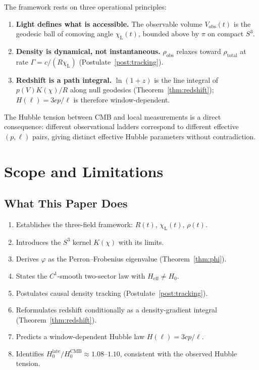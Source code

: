 \documentclass[12pt,a4paper]{amsart}
\theoremstyle{plain}
\theoremstyle{definition}
\theoremstyle{remark}
\newcommand{\vp}{\varphi}
\newcommand{\Sthree}{S^3}
\newcommand{\Hzero}{H_0}
\newcommand{\Heff}{H_{\mathrm{eff}}}
\newcommand{\Vobs}{V_{\mathrm{obs}}}
\newcommand{\chiL}{\chi_{\mathrm{L}}}
\newcommand{\rhotot}{\rho_{\mathrm{total}}}
\newcommand{\rhoobs}{\rho_{\mathrm{obs}}}
\begin{document}
The framework rests on three operational principles:

\begin{enumerate}[label=(\arabic*),noitemsep]
\item \textbf{Light defines what is accessible.} The observable volume
  $\Vobs(t)$ is the geodesic ball of comoving angle $\chiL(t)$,
  bounded above by $\pi$ on compact $\Sthree$.
\item \textbf{Density is dynamical, not instantaneous.} $\rhoobs$
  relaxes toward $\rhotot$ at rate $\Gamma=c/(R\chiL)$
  (Postulate~\ref{post:tracking}).
\item \textbf{Redshift is a path integral.} $\ln(1+z)$ is the line
  integral of $p(V)K(\chi)/R$ along null geodesics
  (Theorem~\ref{thm:redshift}); $H(\ell)=3cp/\ell$ is therefore
  window-dependent.
\end{enumerate}

The Hubble tension between CMB and local measurements is a direct
consequence: different observational ladders correspond to different
effective $(p,\ell)$ pairs, giving distinct effective Hubble parameters
without contradiction.

\section{Scope and Limitations}
\label{sec:scope}

\subsection{What This Paper Does}

\begin{enumerate}[label=(Y\arabic*),noitemsep]
\item Establishes the three-field framework: $R(t)$, $\chiL(t)$, $\rho(t)$.
\item Introduces the $\Sthree$ kernel $K(\chi)$ with its limits.
\item Derives $\vp$ as the Perron--Frobenius eigenvalue
  (Theorem~\ref{thm:phi}).
\item States the $C^1$-smooth two-sector law with $\Heff\neq H_0$.
\item Postulates causal density tracking
  (Postulate~\ref{post:tracking}).
\item Reformulates redshift conditionally as a density-gradient integral
  (Theorem~\ref{thm:redshift}).
\item Predicts a window-dependent Hubble law $H(\ell)=3cp/\ell$.
\item Identifies $\Hzero^{\mathrm{late}}/\Hzero^{\mathrm{CMB}}\approx 1.08$--$1.10$,
  consistent with the observed Hubble tension.
\end{enumerate}
\end{document}
